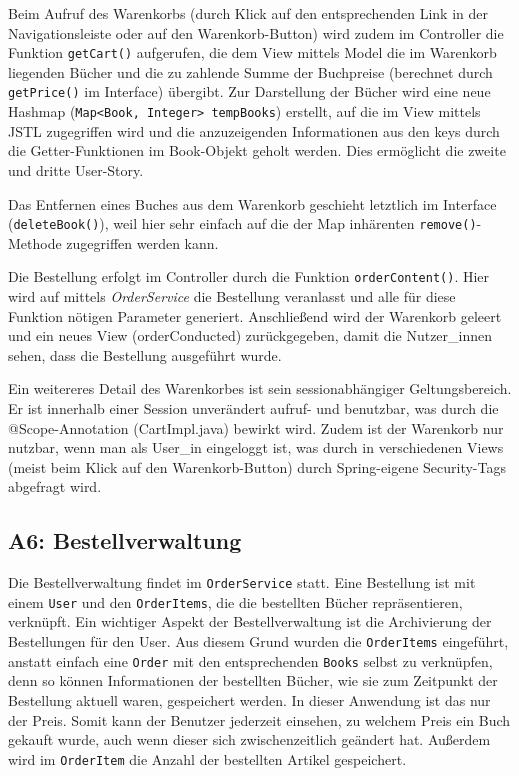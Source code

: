 	Beim Aufruf des Warenkorbs (durch Klick auf den entsprechenden Link in der Navigationsleiste oder auf den Warenkorb-Button) wird zudem im Controller die Funktion \lstinline|getCart()| aufgerufen, die dem View mittels Model die im Warenkorb liegenden Bücher und die zu zahlende Summe der Buchpreise (berechnet durch \lstinline|getPrice()| im Interface) übergibt. Zur Darstellung der Bücher wird eine neue Hashmap (\lstinline|Map<Book, Integer> tempBooks|) erstellt, auf die im View mittels JSTL zugegriffen wird und die anzuzeigenden Informationen aus den keys durch die Getter-Funktionen im Book-Objekt geholt werden. Dies ermöglicht die zweite und dritte User-Story.
	
	Das Entfernen eines Buches aus dem Warenkorb geschieht letztlich im Interface (\lstinline|deleteBook()|), weil hier sehr einfach auf die der Map inhärenten \lstinline|remove()|-Me\-tho\-de zugegriffen werden kann.
	
	Die Bestellung erfolgt im Controller durch die Funktion \lstinline|orderContent()|. Hier wird auf mittels \textit{OrderService} die Bestellung veranlasst und alle für diese Funktion nötigen Parameter generiert. Anschließend wird der Warenkorb geleert und ein neues View (orderConducted) zurückgegeben, damit die Nutzer\_innen sehen, dass die Bestellung ausgeführt wurde.
	
	Ein weitereres Detail des Warenkorbes ist sein sessionabhängiger Geltungsbereich. Er ist innerhalb einer Session unverändert aufruf- und benutzbar, was durch die @Scope-Annotation (CartImpl.java) bewirkt wird. Zudem ist der Warenkorb nur nutzbar, wenn man als User_in eingeloggt ist, was durch in verschiedenen Views (meist beim Klick auf den Warenkorb-Button) durch Spring-eigene Security-Tags abgefragt wird.
	
	\subsection{A6: Bestellverwaltung}\label{sec:umsetzung:Bestellverwaltung}
	Die Bestellverwaltung findet im \texttt{OrderService} statt. Eine Bestellung ist mit einem \texttt{User} und den \texttt{OrderItems}, die die bestellten Bücher repräsentieren, verknüpft. Ein wichtiger Aspekt der Bestellverwaltung ist die Archivierung der Bestellungen für den User. Aus diesem Grund wurden die \texttt{OrderItems} eingeführt, anstatt einfach eine \texttt{Order} mit den entsprechenden \texttt{Books} selbst zu verknüpfen, denn so können Informationen der bestellten Bücher, wie sie zum Zeitpunkt der Bestellung aktuell waren, gespeichert werden. In dieser Anwendung ist das nur der Preis. Somit kann der Benutzer jederzeit einsehen, zu welchem Preis ein Buch gekauft wurde, auch wenn dieser sich zwischenzeitlich geändert hat. Außerdem wird im \texttt{OrderItem} die Anzahl der bestellten Artikel gespeichert.
	
